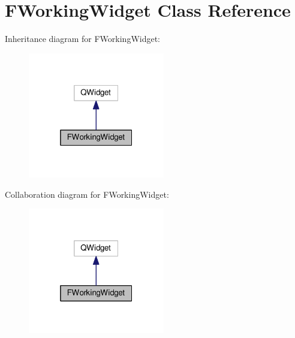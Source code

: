\hypertarget{classFWorkingWidget}{}\section{F\+Working\+Widget Class Reference}
\label{classFWorkingWidget}


Inheritance diagram for F\+Working\+Widget\+:
\nopagebreak
\begin{figure}[H]
\begin{center}
\leavevmode
\includegraphics[width=169pt]{classFWorkingWidget__inherit__graph}
\end{center}
\end{figure}


Collaboration diagram for F\+Working\+Widget\+:
\nopagebreak
\begin{figure}[H]
\begin{center}
\leavevmode
\includegraphics[width=169pt]{classFWorkingWidget__coll__graph}
\end{center}
\end{figure}
